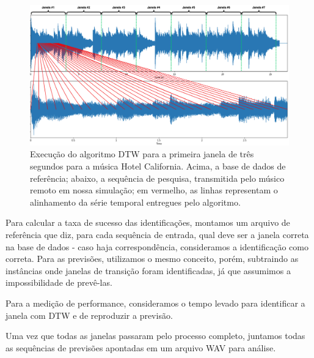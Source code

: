 \begin{figure}[htbp]
    \centering
    \includegraphics[width=1\textwidth]{images/dtw hotel California.png}
    \caption{Execução do algoritmo DTW para a primeira janela de três segundos para a música Hotel California. Acima, a base de dados de referência; abaixo, a sequência de pesquisa, transmitida pelo músico remoto em nossa simulação; em vermelho, as linhas representam o alinhamento da série temporal entregues pelo algoritmo.}
    \label{fig:dtw_hotel_california}
\end{figure}

Para calcular a taxa de sucesso das identificações, montamos um arquivo de referência que diz, para cada sequência de entrada, qual deve ser a janela correta na base de dados - caso haja correspondência, consideramos a identificação como correta. Para as previsões, utilizamos o mesmo conceito, porém, subtraindo as instâncias onde janelas de transição foram identificadas, já que assumimos a impossibilidade de prevê-las.

Para a medição de performance, consideramos o tempo levado para identificar a janela com DTW e de reproduzir a previsão.

Uma vez que todas as janelas passaram pelo processo completo, juntamos todas as sequências de previsões apontadas em um arquivo WAV para análise.
